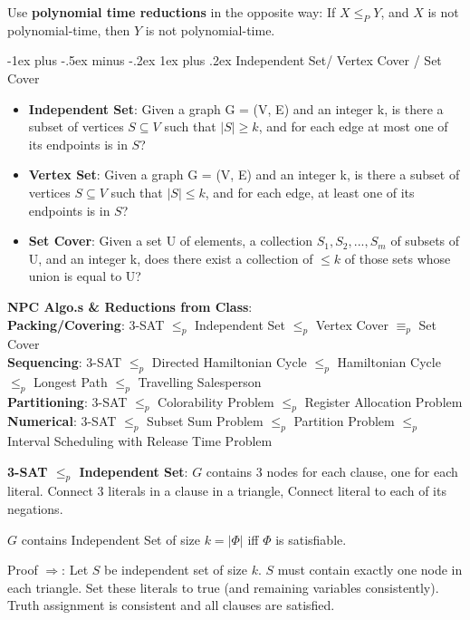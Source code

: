 \documentclass[letterpaper, 8pt]{extarticle}
\makeatletter
\renewcommand{\subsubsection}{\@startsection{subsubsection}{3}{0mm}%
                                {-1ex plus -.5ex minus -.2ex}%
                                {1ex plus .2ex}%
                                {\normalfont\tiny\bfseries}}
\makeatother
\begin{document}
\begin{multicols*}{5}
Use \textbf{polynomial time reductions} in the opposite way:
If $X \leq_P Y$, and $X$ is not polynomial-time,
then $Y$ is not polynomial-time.


\subsubsection{Independent Set/ Vertex Cover / Set Cover}
\begin{itemize}
    \item \textbf{Independent Set}: Given a graph G = (V, E) and an integer k, is there a subset of vertices $S \subseteq V$ such that $|S| \geq k$, and for each edge at most one of its endpoints is in $S$?
    \item \textbf{Vertex Set}: Given a graph G = (V, E) and an integer k, is there a subset of vertices $S \subseteq V$ such that $|S| \leq k$, and for each edge, at least one of its endpoints is in $S$?
    \item \textbf{Set Cover}: Given a set U of elements, a collection $S_1, S_2, ..., S_m$ of subsets of U, and an integer k, does there exist a collection of $\leq k$ of those sets whose union is equal to U?
\end{itemize}


\textbf{NPC Algo.s \& Reductions from Class}:\\
\textbf{Packing/Covering}: 3-SAT $\le_p$ Independent Set $\le_p$ Vertex Cover $\equiv_p$ Set Cover \\
\textbf{Sequencing}: 3-SAT $\le_p$ Directed Hamiltonian Cycle $\le_p$ Hamiltonian Cycle $\le_p$ Longest Path $\le_p$ Travelling Salesperson\\
\textbf{Partitioning}: 3-SAT $\le_p$ Colorability Problem $\le_p$ Register Allocation Problem \\
\textbf{Numerical}: 3-SAT $\le_p$ Subset Sum Problem $\le_p$ Partition Problem $\le_p$ Interval Scheduling with Release Time Problem

\textbf{3-SAT $\le_p$ Independent Set}:
$G$ contains 3 nodes for each clause, one for each literal. Connect $3$ literals in a clause in a triangle, Connect literal to each of its negations.

$G$ contains Independent Set of size $k = |\Phi|$ iff $\Phi$ is satisfiable.

Proof $\Rightarrow$: Let $S$ be independent set of size $k$. $S$ must contain exactly one node in each triangle. Set these literals to true (and remaining variables consistently). Truth assignment is consistent and all clauses are satisfied.


\end{multicols*}
\end{document}
